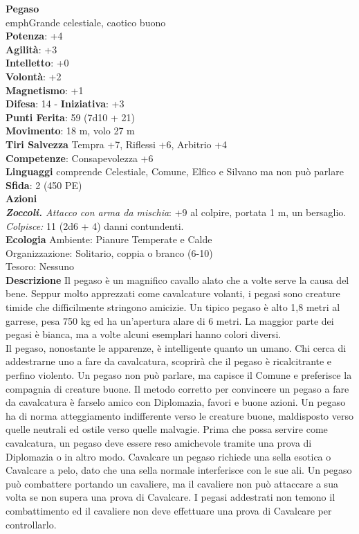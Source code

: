 \begin{multicols}{2}
\medskip\textbf{Pegaso}\\
emph{Grande celestiale, caotico buono}\\
\textbf{Potenza}: +4\\
\textbf{Agilità}: +3\\
\textbf{Intelletto}: +0\\
\textbf{Volontà}: +2\\
\textbf{Magnetismo}: +1\\
\textbf{Difesa}: 14 - \textbf{Iniziativa}: +3\\
\textbf{Punti Ferita}: 59 (7d10 + 21)\\
\textbf{Movimento}: 18 m, volo 27 m\\
\textbf{Tiri Salvezza} Tempra +7, Riflessi +6, Arbitrio +4\\
\textbf{Competenze}: Consapevolezza +6\\
\textbf{Linguaggi} comprende Celestiale, Comune, Elfico e Silvano ma non può parlare\\
\textbf{Sfida}: 2 (450 PE)\smallskip\\
\smallskip\textbf{Azioni}\\
\emph{\textbf{Zoccoli.} Attacco con arma da mischia}: +9 al colpire, portata 1 m, un bersaglio.\\
\emph{Colpisce:} 11 (2d6 + 4) danni contundenti.\\
\textbf{Ecologia}
Ambiente: Pianure Temperate e Calde\\
Organizzazione: Solitario, coppia o branco (6-10)\\
Tesoro: Nessuno\\
\textbf{Descrizione}
Il pegaso è un magnifico cavallo alato che a volte serve la causa del bene. Seppur molto apprezzati come cavalcature volanti, i pegasi sono creature timide che difficilmente stringono amicizie. Un tipico pegaso è alto 1,8 metri al garrese, pesa 750 kg ed ha un’apertura alare di 6 metri. La maggior parte dei pegasi è bianca, ma a volte alcuni esemplari hanno colori diversi.\\

Il pegaso, nonostante le apparenze, è intelligente quanto un umano. Chi cerca di addestrarne uno a fare da cavalcatura, scoprirà che il pegaso è ricalcitrante e perfino violento. Un pegaso non può parlare, ma capisce il Comune e preferisce la compagnia di creature buone. Il metodo corretto per convincere un pegaso a fare da cavalcatura è farselo amico con Diplomazia, favori e buone azioni. Un pegaso ha di norma atteggiamento indifferente verso le creature buone, maldisposto verso quelle neutrali ed ostile verso quelle malvagie. Prima che possa servire come cavalcatura, un pegaso deve essere reso amichevole tramite una prova di Diplomazia o in altro modo. Cavalcare un pegaso richiede una sella esotica o Cavalcare a pelo, dato che una sella normale interferisce con le sue ali. Un pegaso può combattere portando un cavaliere, ma il cavaliere non può attaccare a sua volta se non supera una prova di Cavalcare. I pegasi addestrati non temono il combattimento ed il cavaliere non deve effettuare una prova di Cavalcare per controllarlo.\\


\end{multicols}
